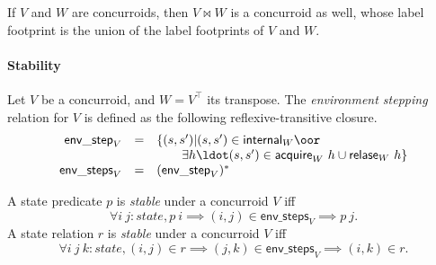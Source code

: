 \begin{lemma}[Entanglement]
If $V$ and $W$ are concurroids, then $V \bowtie W$ is a concurroid as
well, whose label footprint is the union of the label footprints of
$V$ and $W$.
\end{lemma}


\paragraph{Stability}

\begin{definition}
Let $V$ be a concurroid, and $W = V^\top$ its transpose. The
\emph{environment stepping} relation for $V$ is defined as the
following reflexive-transitive closure.
\[
\begin{array}{rcl}
\mathsf{env\_step}_V & = &
  \{(s, s') | (s, s') \in \mathsf{internal}_W \oor \hbox{}\\
& & \qquad \exists h\ldot (s, s') \in \mathsf{acquire}_W\ h \cup 
                           \mathsf{relase}_W\ h\}\\
\mathsf{env\_steps}_V & = & (\mathsf{env\_step}_V)^*
\end{array}
\]
\end{definition}


\begin{definition}[Stability]
A state predicate $p$ is \emph{stable} under a concurroid $V$ iff
\[
\forall i\ j{:}state, p\ i \implies (i, j) \in \mathsf{env\_steps}_V \implies p\ j.
\]
A state relation $r$ is \emph{stable} under a concurroid $V$ iff
\[
\forall i\ j\ k{:}state, (i, j) \in r \implies (j, k) \in \mathsf{env\_steps}_V \implies (i, k) \in r.
\]

\end{definition}


